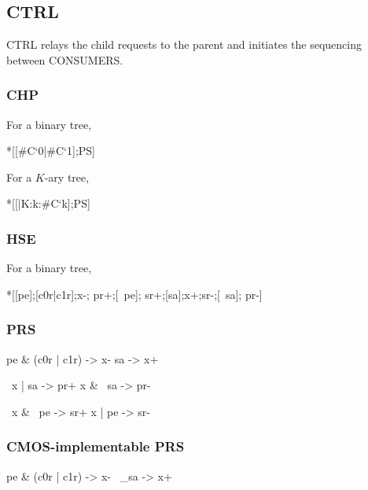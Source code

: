 \documentclass[aer.tex]{subfiles}
\begin{document}
\subsection{CTRL}

CTRL relays the child requests to the parent 
and initiates the sequencing between CONSUMERS.

\subsubsection*{CHP}

For a binary tree,

\begin{csp}
*[[#{C`0}|#{C`1}];P\*S]
\end{csp}

\noindent For a $K$-ary tree,

\begin{csp}
*[[\langle|K:k:#{C`k}\rangle];P\*S]
\end{csp}

\subsubsection*{HSE}

For a binary tree,

\begin{hse}
*[[pe];[c0r|c1r];x-;
  pr+;[~pe];
  sr+;[sa];x+;sr-;[~sa];
  pr-]
\end{hse}

\subsubsection*{PRS}

\begin{prs2}
pe & (c0r | c1r) -> x-
sa -> x+
\end{prs2}

\begin{prs2}
~x | sa -> pr+
x & ~sa -> pr-
\end{prs2}

\begin{prs2}
~x & ~pe -> sr+
x | pe -> sr-
\end{prs2}

\subsubsection*{CMOS-implementable PRS}

\begin{prs2}
pe & (c0r | c1r) -> x-
~_sa -> x+
\end{prs2}
\end{document}

